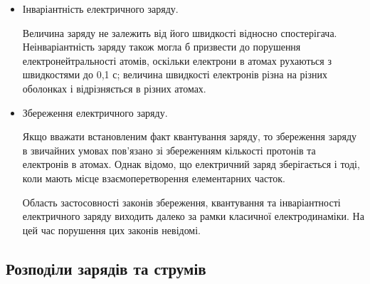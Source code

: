 \begin{itemize}
\item Інваріантність електричного заряду.


Величина заряду не залежить від
його швидкості відносно спостерігача. Неінваріантність заряду також могла б
призвести до порушення електронейтральності атомів, оскільки електрони в
атомах рухаються з швидкостями до 0,1 с; величина швидкості електронів
різна на різних оболонках і відрізняється в різних атомах.



\item Збереження електричного заряду.



Якщо вважати встановленим факт
квантування заряду, то збереження заряду в звичайних умовах пов’язано зі
збереженням кількості протонів та електронів в атомах. Однак відомо, що
електричний заряд зберігається і тоді, коли мають місце взаємоперетворення
елементарних часток.

Область застосовності законів збереження, квантування та інваріантності
електричного заряду виходить далеко за рамки класичної електродинаміки. На
цей час порушення цих законів невідомі.

\end{itemize}

\subsection*{Розподіли зарядів та струмів}

